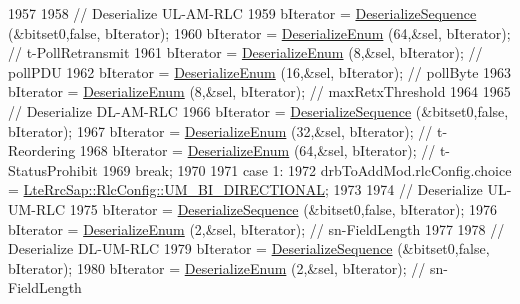 \begin{DoxyCode}
1957 
1958               \textcolor{comment}{// Deserialize UL-AM-RLC}
1959               bIterator = \hyperlink{classns3_1_1Asn1Header_a58c68bb97ba3fe2e8fcdd7c208d672b2}{DeserializeSequence} (&bitset0,\textcolor{keyword}{false}, bIterator);
1960               bIterator = \hyperlink{classns3_1_1Asn1Header_a4fcc253e0eec3483c775b005c1875f2d}{DeserializeEnum} (64,&sel, bIterator); \textcolor{comment}{// t-PollRetransmit}
1961               bIterator = \hyperlink{classns3_1_1Asn1Header_a4fcc253e0eec3483c775b005c1875f2d}{DeserializeEnum} (8,&sel, bIterator); \textcolor{comment}{// pollPDU}
1962               bIterator = \hyperlink{classns3_1_1Asn1Header_a4fcc253e0eec3483c775b005c1875f2d}{DeserializeEnum} (16,&sel, bIterator); \textcolor{comment}{// pollByte}
1963               bIterator = \hyperlink{classns3_1_1Asn1Header_a4fcc253e0eec3483c775b005c1875f2d}{DeserializeEnum} (8,&sel, bIterator); \textcolor{comment}{// maxRetxThreshold}
1964 
1965               \textcolor{comment}{// Deserialize DL-AM-RLC}
1966               bIterator = \hyperlink{classns3_1_1Asn1Header_a58c68bb97ba3fe2e8fcdd7c208d672b2}{DeserializeSequence} (&bitset0,\textcolor{keyword}{false}, bIterator);
1967               bIterator = \hyperlink{classns3_1_1Asn1Header_a4fcc253e0eec3483c775b005c1875f2d}{DeserializeEnum} (32,&sel, bIterator); \textcolor{comment}{// t-Reordering}
1968               bIterator = \hyperlink{classns3_1_1Asn1Header_a4fcc253e0eec3483c775b005c1875f2d}{DeserializeEnum} (64,&sel, bIterator); \textcolor{comment}{// t-StatusProhibit}
1969               \textcolor{keywordflow}{break};
1970 
1971             \textcolor{keywordflow}{case} 1:
1972               drbToAddMod.rlcConfig.choice = 
      \hyperlink{structns3_1_1LteRrcSap_1_1RlcConfig_ab6ab94ca4abaf717926f31db4dddc61ba55368feac1627138969235809e6eedc5}{LteRrcSap::RlcConfig::UM\_BI\_DIRECTIONAL};
1973 
1974               \textcolor{comment}{// Deserialize UL-UM-RLC}
1975               bIterator = \hyperlink{classns3_1_1Asn1Header_a58c68bb97ba3fe2e8fcdd7c208d672b2}{DeserializeSequence} (&bitset0,\textcolor{keyword}{false}, bIterator);
1976               bIterator = \hyperlink{classns3_1_1Asn1Header_a4fcc253e0eec3483c775b005c1875f2d}{DeserializeEnum} (2,&sel, bIterator); \textcolor{comment}{// sn-FieldLength}
1977 
1978               \textcolor{comment}{// Deserialize DL-UM-RLC}
1979               bIterator = \hyperlink{classns3_1_1Asn1Header_a58c68bb97ba3fe2e8fcdd7c208d672b2}{DeserializeSequence} (&bitset0,\textcolor{keyword}{false}, bIterator);
1980               bIterator = \hyperlink{classns3_1_1Asn1Header_a4fcc253e0eec3483c775b005c1875f2d}{DeserializeEnum} (2,&sel, bIterator); \textcolor{comment}{// sn-FieldLength}

\end{DoxyCode}
